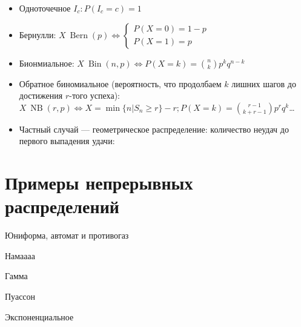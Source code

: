 \documentclass[12pt, a4paper, oneside]{article}
\begin{document}
\begin{itemize}
    \item Одноточечное $I_c: P\left( I_c = c \right) = 1$
    \item Бернулли: $X ~ \operatorname{Bern}\left( p \right) \Leftrightarrow \begin{cases}
        P(X = 0) = 1 - p \\
        P(X = 1) = p
    \end{cases}$
    \item Бионмиальное: $X ~ \operatorname{Bin}\left( n, p \right) \Leftrightarrow P(X = k) = {n \choose k} p^k q^{n - k}$
    \item Обратное биномиальное (вероятность, что продолбаем $k$ лишних шагов до достижения $r$-того успеха): $X ~ \operatorname{NB}\left( r, p \right) \Leftrightarrow X = \min \{ n | S_n \geqslant r \} - r; P(X = k) = {r - 1 \choose k + r - 1} p^r q^{k}$\ldots
    \item Частный случай — геометрическое распределение: количество неудач до первого выпадения удачи: 
\end{itemize}




\section{Примеры непрерывных распределений}

Юниформа, автомат и противогаз

Намаааа

Гамма

Пуассон

Экспоненциальное
\end{document}
